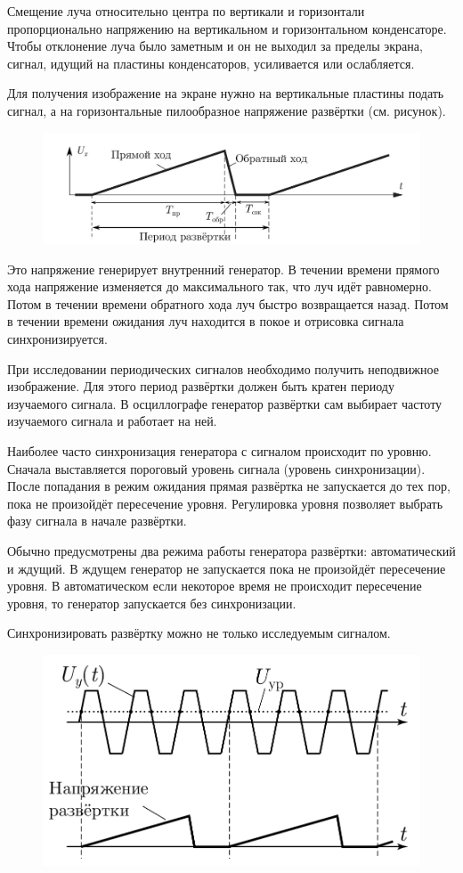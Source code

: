 Смещение луча относительно центра по вертикали и горизонтали пропорционально напряжению
на вертикальном и горизонтальном конденсаторе. Чтобы отклонение луча было заметным и он не
выходил за пределы экрана, сигнал, идущий на пластины конденсаторов, усиливается или
ослабляется.

Для получения изображение на экране нужно на вертикальные пластины подать сигнал, а на
горизонтальные пилообразное напряжение развёртки (см. рисунок).

\begin{figure}[ht!]
    \centering
    \includegraphics[width=0.8\linewidth]{img/picture2.png}
\end{figure}

Это напряжение генерирует внутренний генератор. В течении времени прямого хода
напряжение изменяется до максимального так, что луч идёт равномерно. Потом в течении
времени обратного хода луч быстро возвращается назад. Потом в течении времени ожидания
луч находится в покое и отрисовка сигнала синхронизируется.

При исследовании периодических сигналов необходимо получить неподвижное изображение.
Для этого период развёртки должен быть кратен периоду изучаемого сигнала. В осциллографе
генератор развёртки сам выбирает частоту изучаемого сигнала и работает на ней.

Наиболее часто синхронизация генератора с сигналом происходит по уровню.
Сначала выставляется пороговый уровень сигнала (уровень синхронизации).
После попадания в режим ожидания прямая развёртка не запускается до тех пор, пока не
произойдёт пересечение уровня. Регулировка уровня позволяет выбрать фазу сигнала в начале
развёртки.

Обычно предусмотрены два режима работы генератора развёртки: автоматический и ждущий.
В ждущем генератор не запускается пока не произойдёт пересечение уровня. В автоматическом
если некоторое время не происходит пересечение уровня, то генератор запускается без синхронизации.

Синхронизировать развёртку можно не только исследуемым сигналом.

\begin{figure}[ht!]
    \centering
    \includegraphics[width=0.8\linewidth]{img/picture3.png}
\end{figure}

